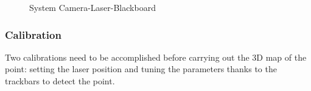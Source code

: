 \begin{figure}[!h] 
\centering
{}
\quad 
{}
\caption{System Camera-Laser-Blackboard} 
\end{figure}

\subsubsection{Calibration}
Two calibrations need to be accomplished before carrying out the 3D map of the point: setting the laser position and tuning the parameters thanks to the trackbars to detect the point.
